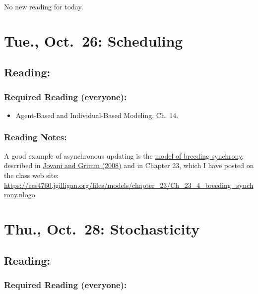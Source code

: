 \documentclass[
]{article}
\providecommand{\tightlist}{%
  \setlength{\itemsep}{0pt}\setlength{\parskip}{0pt}}
\begin{document}
No new reading for today.

\hypertarget{tue.-oct.-26-scheduling}{%
\section{Tue., Oct.~26: Scheduling}\label{tue.-oct.-26-scheduling}}

\hypertarget{reading-16}{%
\subsection{Reading:}\label{reading-16}}

\hypertarget{required-reading-everyone-13}{%
\subsubsection{Required Reading
(everyone):}\label{required-reading-everyone-13}}

\begin{itemize}
\tightlist
\item
  Agent-Based and Individual-Based Modeling, Ch. 14.
\end{itemize}

\hypertarget{reading-notes-12}{%
\subsubsection{Reading Notes:}\label{reading-notes-12}}

A good example of asynchronous updating is the
\href{/files/models/chapter_23/Ch_23_4_breeding_synchrony.nlogo}{model
of breeding synchrony}, described in
\href{/files/models/chapter_05/Jovani_Grimm_2008_Breeding.pdf}{Jovani
and Grimm (2008)} and in Chapter 23, which I have posted on the class
web site:
\url{https://ees4760.jgilligan.org/files/models/chapter_23/Ch_23_4_breeding_synchrony.nlogo}

\hypertarget{thu.-oct.-28-stochasticity}{%
\section{Thu., Oct.~28:
Stochasticity}\label{thu.-oct.-28-stochasticity}}

\hypertarget{reading-17}{%
\subsection{Reading:}\label{reading-17}}

\hypertarget{required-reading-everyone-14}{%
\subsubsection{Required Reading
(everyone):}\label{required-reading-everyone-14}}
\end{document}
